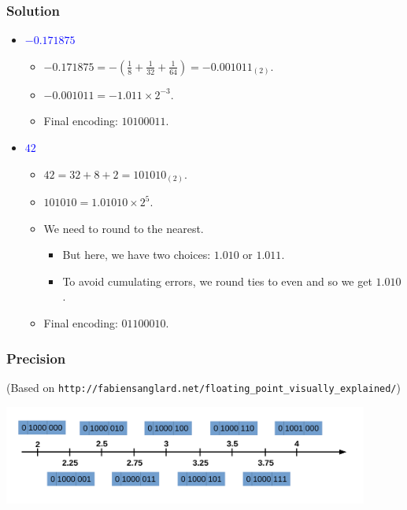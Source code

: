 \documentclass{beamer}
\newcounter{exo}
\newcommand{\exo}{
  \addtocounter{exo}{1}
  Exercice \arabic{exo}
}
\begin{document}

\ifanswers
\begin{frame}%
\frametitle{Solution}

\begin{itemize}

\item \textcolor{blue}{$-0.171875$}
  \begin{itemize}
  \item $-0.171875 = -(\frac{1}{8} + \frac{1}{32} + \frac{1}{64}) = -0.001011_{(2)}$.
  \item $-0.001011 = -1.011 \times 2^{-3}$.
  \item Final encoding: $1 0100 011$.
  \end{itemize}

\item \textcolor{blue}{$42$}
  \begin{itemize}
  \item $42 = 32 + 8 + 2 = 101010_{(2)}$.
  \item $101010 = 1.01010 \times 2^5$.
  \item We need to round to the nearest.
    \begin{itemize}
    \item But here, we have two choices: $1.010$ or $1.011$.
    \item To avoid cumulating errors, we round ties to even and so we get $1.010$.
    \end{itemize}
  \item Final encoding: $0 1100 010$.
  \end{itemize}

\end{itemize}

\end{frame}
\fi

\begin{frame}%
\frametitle{Precision}
\tiny
(Based on \texttt{http://fabiensanglard.net/floating\_point\_visually\_explained/})

\begin{center}
  \includegraphics[width=12cm]{float2.pdf}
\end{center}

\end{frame}
\end{document}
